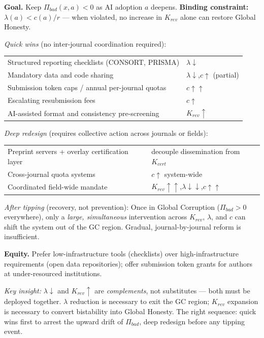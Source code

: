 \documentclass{article}
\begin{document}
\begin{tcolorbox}[boxstyle, title={Box S4\quad Policy Menu: Institutions, Levers, and Sequencing}]
\small
\textbf{Goal.}\;
Keep $\Pi_{bad}(x,a)<0$ as AI adoption $a$ deepens.
\textbf{Binding constraint:}\; $\lambda(a)<c(a)/r$ --- when violated, no increase in $K_{rev}$ alone can restore Global Honesty.

\medskip
\noindent\textit{Quick wins} (no inter-journal coordination required):\smallskip

\noindent
\begin{tabular}{@{}p{8.2cm}l@{}}
Structured reporting checklists (CONSORT, PRISMA) & $\lambda\downarrow$ \\
Mandatory data and code sharing                   & $\lambda\downarrow$,\;$c\uparrow$ (partial) \\
Submission token caps / annual per-journal quotas & $c\uparrow\uparrow$ \\
Escalating resubmission fees                      & $c\uparrow$ \\
AI-assisted format and consistency pre-screening  & $K_{rev}\uparrow$ \\
\end{tabular}

\medskip
\noindent\textit{Deep redesign} (requires collective action across journals or fields):\smallskip

\noindent
\begin{tabular}{@{}p{8.2cm}l@{}}
Preprint servers + overlay certification layer         & decouple dissemination from $K_{cert}$ \\
Cross-journal quota systems                           & $c\uparrow$ system-wide \\
Coordinated field-wide mandate                        & $K_{rev}\uparrow\uparrow$,\;$\lambda\downarrow\downarrow$,\;$c\uparrow\uparrow$ \\
\end{tabular}

\medskip
\noindent\textit{After tipping} (recovery, not prevention):\;
Once in Global Corruption ($\Pi_{bad}>0$ everywhere), only a \emph{large, simultaneous} intervention across $K_{rev}$, $\lambda$, and $c$ can shift the system out of the GC region.
Gradual, journal-by-journal reform is insufficient.

\medskip
\noindent\textbf{Equity.}\;
Prefer low-infrastructure tools (checklists) over high-infrastructure requirements (open data repositories); offer submission token grants for authors at under-resourced institutions.

\medskip
\noindent\textit{Key insight:}\;
$\lambda\downarrow$ and $K_{rev}\uparrow$ are \emph{complements}, not substitutes --- both must be deployed together.
$\lambda$ reduction is necessary to exit the GC region; $K_{rev}$ expansion is necessary to convert bistability into Global Honesty.
The right sequence: quick wins first to arrest the upward drift of $\Pi_{bad}$, deep redesign before any tipping event.
\end{tcolorbox}
\end{document}
